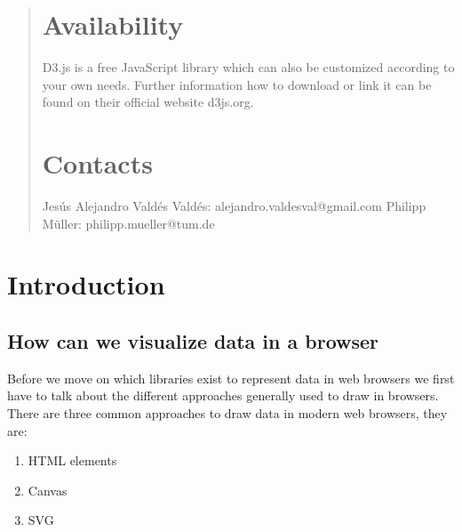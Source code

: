 \documentclass{bioinfo}
\begin{document}
\begin{abstract}
\section{Availability}
\newline
D3.js is a free JavaScript library which can also be customized according to your own needs. Further information how to download or link it can be found on their official website d3js.org.

\section{Contacts}
\newline
Jes\'us Alejandro Vald\'es Vald\'es: alejandro.valdesval@gmail.com \newline
Philipp M\"uller: philipp.mueller@tum.de
\end{abstract}

\section{Introduction}
\subsection{How can we visualize data in a browser}
Before we move on which libraries exist to represent data in web browsers we first have to talk about the different approaches generally used to draw in browsers.
There are three common approaches to draw data in modern web browsers, they are:
\begin{enumerate}
\item HTML elements
\item Canvas
\item SVG
\end{enumerate}
\end{document}
